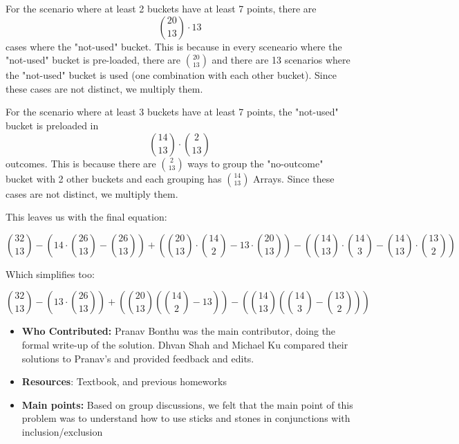 \documentclass[11pt]{article}
\begin{document}
For the scenario where at least 2 buckets have at least 7 points, there are  
$$\binom{20}{13} \cdot 13$$
cases where the "not-used" bucket. This is because in every sceneario where the "not-used" bucket is pre-loaded, there are $\binom{20}{13}$ and there are 13 scenarios where the "not-used" bucket is used (one combination with each other bucket). Since these cases are not distinct, we multiply them.

For the scenario where at least 3 buckets have at least 7 points, the "not-used" bucket is preloaded in  
$$\binom{14}{13} \cdot \binom{2}{13}$$
outcomes. This is because there are $\binom{2}{13}$ ways to group the "no-outcome" bucket with 2 other buckets and each grouping has $\binom{14}{13}$ Arrays. Since these cases are not distinct, we multiply them.

This leaves us with the final equation:

$$\binom{32}{13} - (14 \cdot \binom{26}{13} - \binom{26}{13}) + (\binom{20}{13} \cdot \binom{14}{2} - 13 \cdot \binom{20}{13}) - (\binom{14}{13} \cdot \binom{14}{3} - \binom{14}{13} \cdot \binom{13}{2})$$

Which simplifies too:


$$\binom{32}{13} - (13 \cdot \binom{26}{13}) + (\binom{20}{13} (\binom{14}{2} - 13 )) - (\binom{14}{13} (\binom{14}{3} - \binom{13}{2}))$$


\begin{itemize}
    \item \textbf{Who Contributed:} Pranav Bonthu was the main contributor, doing the formal write-up of the solution. Dhvan Shah and Michael Ku compared their solutions to Pranav's and provided feedback and edits.
    \item \textbf{Resources}: Textbook, and previous homeworks
    \item \textbf{Main points:} Based on group discussions, we felt that the main point of this problem was to understand how to use sticks and stones in conjunctions with inclusion/exclusion
\end{itemize}
\end{document}
